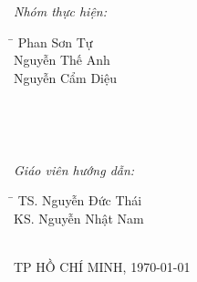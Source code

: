 \begin{titlepage}
\begin{minipage}{0.5\textwidth}
\begin{flushleft} \large
\emph{Nhóm thực hiện:}
\begin{tabbing}
\hspace{4.5cm}\= \kill
Phan Sơn Tự\\
Nguyễn Thế Anh\\
Nguyễn Cẩm Diệu
\end{tabbing}
\end{flushleft}
\end{minipage}
~
\begin{minipage}{0.2\textwidth}
\end{minipage}
~
\begin{minipage}{0.4\textwidth}
\begin{flushleft} \large
\emph{Giáo viên hướng dẫn:}\\
\begin{tabbing}
\hspace{4cm}\= \kill
TS. Nguyễn Đức Thái\\
KS. Nguyễn Nhật Nam\\
\end{tabbing}
\end{flushleft}
\end{minipage}\\[4cm]



{\large TP HỒ CHÍ MINH, \today}\\[3cm] %


 

\vfill %

\end{titlepage}
